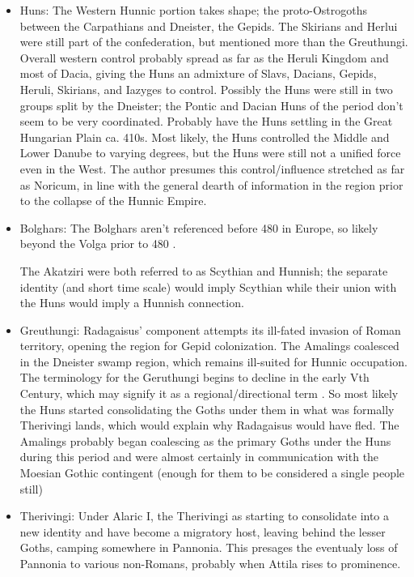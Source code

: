 \documentclass{article}
\begin{document}
	\begin{itemize}
		\item Huns:\newline
		The Western Hunnic portion takes shape; the proto-Ostrogoths between the Carpathians and Dneister, the Gepids.
		The Skirians and Herlui were still part of the confederation, but mentioned more than the Greuthungi.
		Overall western control probably spread as far as the Heruli Kingdom and most of Dacia, giving the Huns an admixture of Slavs, Dacians, Gepids, Heruli, Skirians, and Iazyges to control.
		Possibly the Huns were still in two groups split by the Dneister; the Pontic and Dacian Huns of the period don't seem to be very coordinated.
		Probably have the Huns settling in the Great Hungarian Plain ca. 410s.
		Most likely, the Huns controlled the Middle and Lower Danube to varying degrees, but the Huns were still not a unified force even in the West.
		The author presumes this control/influence stretched as far as Noricum, in line with the general dearth of information in the region prior to the collapse of the Hunnic Empire.
		
		\item Bolghars:\newline
		The Bolghars aren't referenced before 480 in Europe, so likely beyond the Volga prior to 480 \cite{KimHuns}.
		
		The Akatziri were both referred to as Scythian and Hunnish; the separate identity (and short time scale) would imply Scythian while their union with the Huns would imply a Hunnish connection.
		
		\item Greuthungi:\newline
		Radagaisus' component attempts its ill-fated invasion of Roman territory, opening the region for Gepid colonization.
		The Amalings coalesced in the Dneister swamp region, which remains ill-suited for Hunnic occupation.
		The terminology for the Geruthungi begins to decline in the early Vth Century, which may signify it as a regional/directional term \cite{WolframHistoryOfTheGoths}.
		So most likely the Huns started consolidating the Goths under them in what was formally Therivingi lands, which would explain why Radagaisus would have fled.
		The Amalings probably began coalescing as the primary Goths under the Huns during this period and were almost certainly in communication with the Moesian Gothic contingent (enough for them to be considered a single people still)
		
		\item Therivingi:\newline
		Under Alaric I, the Therivingi as starting to consolidate into a new identity and have become a migratory host, leaving behind the lesser Goths, camping somewhere in Pannonia.
		This presages the eventualy loss of Pannonia to various non-Romans, probably when Attila rises to prominence.
		

\end{itemize}
\end{document}
